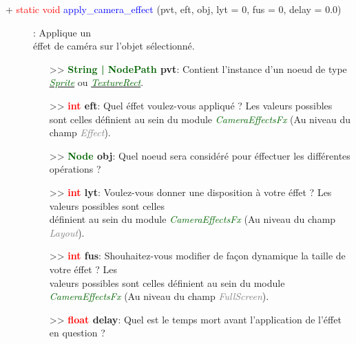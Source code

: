 \documentclass[a4paper, 11pt]{article}
\begin{document}
	\begin{description}
		\item [+ \textcolor{red}{static void} \textcolor{blue}{apply\_camera\_effect} (pvt, eft, obj, lyt = 
		0, fus = 0, delay = 0.0)]: Applique un \\éffet de caméra sur l'objet sélectionné.
		\begin{itemize}
			\item[>> \textbf{\textcolor{darkgreen}{String | NodePath} pvt}:] Contient l'instance d'un noeud
			de type \href{https://docs.godotengine.org/fr/stable/classes/class_sprite.html}
			{\textit{\textcolor{darkgreen}{Sprite}}} ou
			\href{https://docs.godotengine.org/fr/stable/classes/class_texturerect.html}
			{\textit{\textcolor{darkgreen}{TextureRect}}}.
			\item[>> \textbf{\textcolor{red}{int} eft}:] Quel éffet voulez-vous appliqué ? Les valeurs
			possibles sont celles définient au sein du module \textit{\textcolor{darkgreen}
			{CameraEffectsFx}} (Au niveau du champ \textit{\textcolor{gray}{Effect}}).
			\item [>> \textbf{\textcolor{darkgreen}{Node} obj}:] Quel noeud sera considéré pour éffectuer 
			les différentes opérations ?
			\item[>> \textbf{\textcolor{red}{int} lyt}:] Voulez-vous donner une disposition à votre éffet ?
			Les valeurs possibles sont celles \\définient au sein du module \textit{\textcolor{darkgreen}
			{CameraEffectsFx}} (Au niveau du champ \textit{\textcolor{gray}{Layout}}).
			\item[>> \textbf{\textcolor{red}{int} fus}:] Shouhaitez-vous modifier de façon dynamique la 
			taille de votre éffet ? Les \\valeurs possibles sont celles définient au sein du module 
			\textit{\textcolor{darkgreen}{CameraEffectsFx}} (Au niveau du champ \textit{\textcolor{gray}
			{FullScreen}}).
			\item[>> \textbf{\textcolor{red}{float} delay}:] Quel est le temps mort avant l'application de 
			l'éffet en question ?\\
		\end{itemize}
	\end{description}
\end{document}
